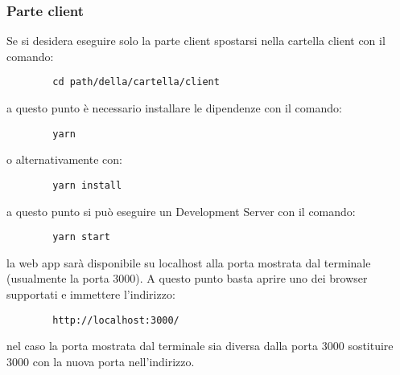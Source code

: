         \subsubsection{Parte client}
        Se si desidera eseguire solo la parte client spostarsi nella cartella client con il comando:
        \begin{verbatim}
        cd path/della/cartella/client
        \end{verbatim}
        a questo punto è necessario installare le dipendenze con il comando: 
        \begin{verbatim}
        yarn
        \end{verbatim}
        o alternativamente con:
        \begin{verbatim}
        yarn install
        \end{verbatim}
        a questo punto si può eseguire un Development Server con il comando:
        \begin{verbatim}
        yarn start
        \end{verbatim}
        la web app sarà disponibile su localhost alla porta mostrata dal terminale (usualmente la porta 3000). A questo punto basta aprire uno dei browser supportati e immettere l'indirizzo:
        \begin{verbatim}
        http://localhost:3000/
        \end{verbatim}
        nel caso la porta mostrata dal terminale sia diversa dalla porta 3000 sostituire 3000 con la nuova porta nell'indirizzo.